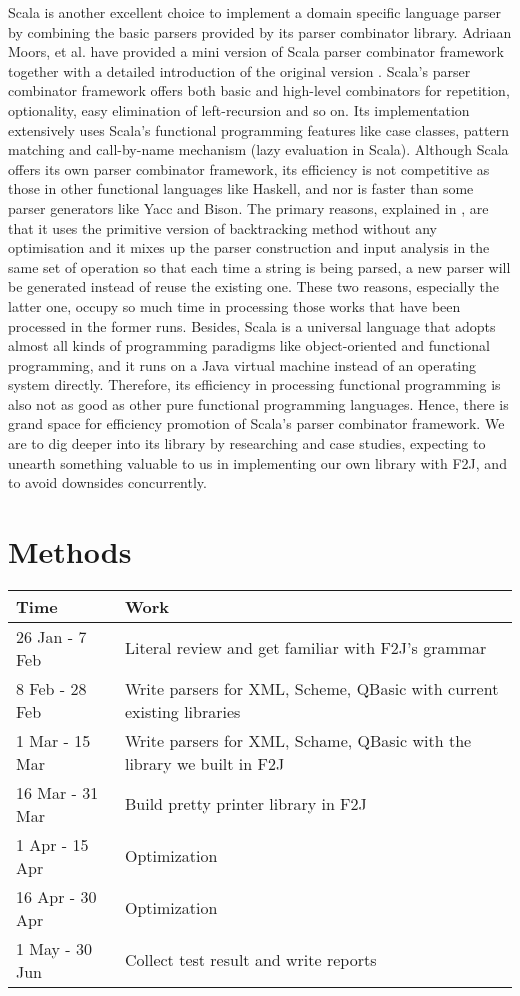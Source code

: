 \documentclass[9pt,a4paper,twocolumn]{article}
\begin{document}
Scala is another excellent choice to implement a domain specific language parser by combining the basic parsers provided by its parser combinator library. Adriaan Moors, et al. have provided a mini version of Scala parser combinator framework together with a detailed introduction of the original version \cite{Moors:2008}. Scala’s parser combinator framework offers both basic and high-level combinators for repetition, optionality, easy elimination of left-recursion and so on. Its implementation extensively uses Scala’s functional programming features like case classes, pattern matching and call-by-name mechanism (lazy evaluation in Scala). Although Scala offers its own parser combinator framework, its efficiency is not competitive as those in other functional languages like Haskell, and nor is faster than some parser generators like Yacc and Bison. The primary reasons, explained in \cite{Scala:2008}, are that it uses the primitive version of backtracking method without any optimisation and it mixes up the parser construction and input analysis in the same set of operation so that each time a string is being parsed, a new parser will be generated instead of reuse the existing one. These two reasons, especially the latter one, occupy so much time in processing those works that have been processed in the former runs.  Besides, Scala is a universal language that adopts almost all kinds of programming paradigms like object-oriented and functional programming, and it runs on a Java virtual machine instead of an operating system directly. Therefore, its efficiency in processing functional programming is also not as good as other pure functional programming languages. Hence, there is grand space for efficiency promotion of Scala’s parser combinator framework. We are to dig deeper into its library by researching and case studies, expecting to unearth something valuable to us in implementing our own library with F2J, and to avoid downsides concurrently.

\section{Methods}
\begin{center}
    \begin{tabular}{| l | l |}
    \hline
    \textbf{Time}   & \textbf{Work} \\
    \hline
    26 Jan - 7 Feb  & Literal review and get familiar with F2J's grammar \\
    \hline
    8 Feb - 28 Feb  & Write parsers for XML, Scheme, QBasic with current existing libraries \\
    \hline
    1 Mar - 15 Mar  & Write parsers for XML, Schame, QBasic with the library we built in F2J \\
    \hline
    16 Mar - 31 Mar & Build pretty printer library in F2J \\
    \hline
    1 Apr - 15 Apr  & Optimization \\
    \hline
    16 Apr - 30 Apr & Optimization \\
    \hline
    1 May - 30 Jun  & Collect test result and write reports \\
    \hline
    \end{tabular}
\end{center}
\end{document}
